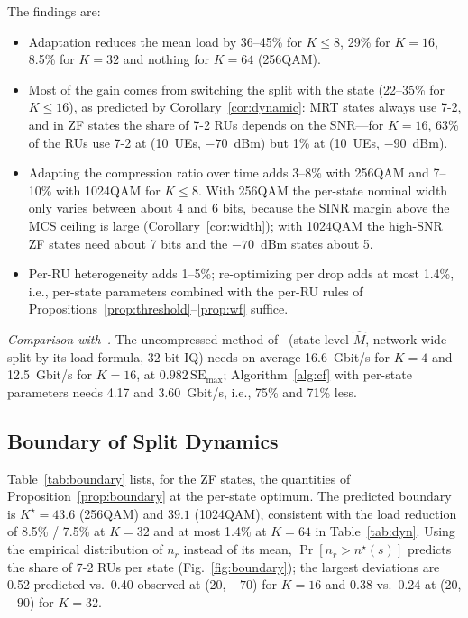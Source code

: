 \documentclass[10pt, final, journal, letterpaper, twocolumn]{IEEEtran}
\begin{document}
The findings are:
\begin{itemize}
  \item Adaptation reduces the mean load by 36--45\% for $K\le8$, 29\% for $K=16$, 8.5\% for $K=32$ and nothing for $K=64$ (256QAM).
  \item Most of the gain comes from switching the split with the state (22--35\% for $K\le16$), as predicted by Corollary~\ref{cor:dynamic}: MRT states always use 7-2, and in ZF states the share of 7-2 RUs depends on the SNR---for $K=16$, 63\% of the RUs use 7-2 at (10~UEs, $-70$~dBm) but 1\% at (10~UEs, $-90$~dBm).
  \item Adapting the compression ratio over time adds 3--8\% with 256QAM and 7--10\% with 1024QAM for $K\le8$. With 256QAM the per-state nominal width only varies between about 4 and 6 bits, because the SINR margin above the MCS ceiling is large (Corollary~\ref{cor:width}); with 1024QAM the high-SNR ZF states need about 7 bits and the $-70$~dBm states about 5.
  \item Per-RU heterogeneity adds 1--5\%; re-optimizing per drop adds at most 1.4\%, i.e., per-state parameters combined with the per-RU rules of Propositions~\ref{prop:threshold}--\ref{prop:wf} suffice.
\end{itemize}
\emph{Comparison with~\cite{girycki2024eucnc}.} The uncompressed method of~\cite{girycki2024eucnc} (state-level $\hat M$, network-wide split by its load formula, 32-bit IQ) needs on average 16.6~Gbit/s for $K=4$ and 12.5~Gbit/s for $K=16$, at $0.982\,\mathrm{SE}_{\max}$; Algorithm~\ref{alg:cf} with per-state parameters needs 4.17 and 3.60~Gbit/s, i.e., 75\% and 71\% less.

\subsection{Boundary of Split Dynamics}
\label{subsec:boundary}

Table~\ref{tab:boundary} lists, for the ZF states, the quantities of Proposition~\ref{prop:boundary} at the per-state optimum. The predicted boundary is $K^\star=43.6$ (256QAM) and $39.1$ (1024QAM), consistent with the load reduction of 8.5\% / 7.5\% at $K=32$ and at most 1.4\% at $K=64$ in Table~\ref{tab:dyn}. Using the empirical distribution of $n_r$ instead of its mean, $\Pr[n_r>n^\star(s)]$ predicts the share of 7-2 RUs per state (Fig.~\ref{fig:boundary}); the largest deviations are 0.52 predicted vs.\ 0.40 observed at (20, $-70$) for $K=16$ and 0.38 vs.\ 0.24 at (20, $-90$) for $K=32$.
\end{document}
